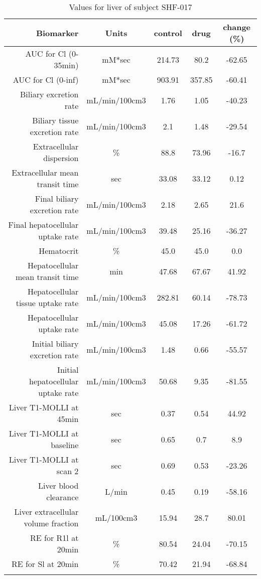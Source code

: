\documentclass{epflreport}%
\begin{document}
%
\clearpage%
\begin{longtable}{rcccc}%
\hline%
Biomarker&Units&control&drug&change (\%)\\%
\hline%
AUC for Cl (0{-}35min)&mM*sec&214.73&80.2&{-}62.65\\%
AUC for Cl (0{-}inf)&mM*sec&903.91&357.85&{-}60.41\\%
Biliary excretion rate&mL/min/100cm3&1.76&1.05&{-}40.23\\%
Biliary tissue excretion rate&mL/min/100cm3&2.1&1.48&{-}29.54\\%
Extracellular dispersion&\%&88.8&73.96&{-}16.7\\%
Extracellular mean transit time&sec&33.08&33.12&0.12\\%
Final biliary excretion rate&mL/min/100cm3&2.18&2.65&21.6\\%
Final hepatocellular uptake rate&mL/min/100cm3&39.48&25.16&{-}36.27\\%
Hematocrit&\%&45.0&45.0&0.0\\%
Hepatocellular mean transit time&min&47.68&67.67&41.92\\%
Hepatocellular tissue uptake rate&mL/min/100cm3&282.81&60.14&{-}78.73\\%
Hepatocellular uptake rate&mL/min/100cm3&45.08&17.26&{-}61.72\\%
Initial biliary excretion rate&mL/min/100cm3&1.48&0.66&{-}55.57\\%
Initial hepatocellular uptake rate&mL/min/100cm3&50.68&9.35&{-}81.55\\%
Liver T1{-}MOLLI at 45min&sec&0.37&0.54&44.92\\%
Liver T1{-}MOLLI at baseline&sec&0.65&0.7&8.9\\%
Liver T1{-}MOLLI at scan 2&sec&0.69&0.53&{-}23.26\\%
Liver blood clearance&L/min&0.45&0.19&{-}58.16\\%
Liver extracellular volume fraction&mL/100cm3&15.94&28.7&80.01\\%
RE for R1l at 20min&\%&80.54&24.04&{-}70.15\\%
RE for Sl at 20min&\%&70.42&21.94&{-}68.84\\%
\hline%
\caption{Values for liver of subject SHF-017} \\%
\end{longtable}%
\end{document}
